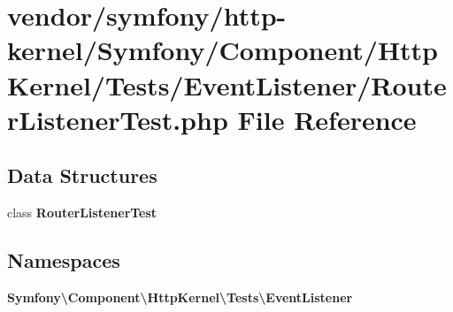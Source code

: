 \section{vendor/symfony/http-\/kernel/\+Symfony/\+Component/\+Http\+Kernel/\+Tests/\+Event\+Listener/\+Router\+Listener\+Test.php File Reference}
\label{_router_listener_test_8php}
\subsection*{Data Structures}
\begin{DoxyCompactItemize}
\item 
class {\bf Router\+Listener\+Test}
\end{DoxyCompactItemize}
\subsection*{Namespaces}
\begin{DoxyCompactItemize}
\item 
 {\bf Symfony\textbackslash{}\+Component\textbackslash{}\+Http\+Kernel\textbackslash{}\+Tests\textbackslash{}\+Event\+Listener}
\end{DoxyCompactItemize}
